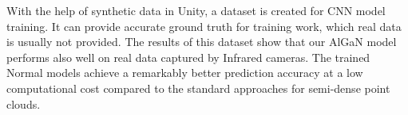 With the help of synthetic data in Unity, a dataset is created for CNN model training. It can provide accurate ground truth for training work, which real data is usually not provided. The results of this dataset show that our AlGaN model performs also well on real data captured by Infrared cameras. The trained Normal models achieve a remarkably better prediction accuracy at a low computational cost compared to the standard approaches for semi-dense point clouds. 





